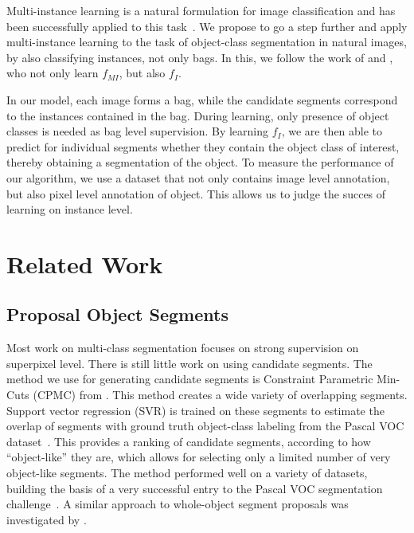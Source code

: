 Multi-instance learning is a natural formulation for image classification and
has been successfully applied to this task~\citep{zhou2007multi}. We propose to
go a step further and apply multi-instance learning to the task of object-class
segmentation in natural images, by also classifying instances, not only bags.
In this, we follow the work of \citet{liconvex2010} and \citet{zha2008joint}, who not
only learn $f_{MI}$, but also $f_{I}$.

In our model, each image forms a bag, while the candidate segments correspond
to the instances contained in the bag. During learning, only presence of object
classes is needed as bag level supervision. By learning $f_{I}$, we are then
able to predict for individual segments whether they contain the object class
of interest, thereby obtaining a segmentation of the object.
To measure the performance of our algorithm, we use a dataset that not only contains
image level annotation, but also pixel level annotation of object. This allows
us to judge the succes of learning on instance level.

\section{Related Work}
\subsection{Proposal Object Segments}\label{related_segments}
Most work on multi-class segmentation focuses on strong supervision on
superpixel level. There is still little work on using candidate segments.  The
method we use for generating candidate segments is Constraint Parametric
Min-Cuts (CPMC) from \citet{carreira2010constrained}.  This method creates a
wide variety of overlapping segments. Support vector regression (SVR) is
trained on these segments to estimate the overlap of segments with ground truth
object-class labeling from the Pascal VOC dataset~\citep{pascal}. This provides
a ranking of candidate segments, according to how ``object-like'' they are,
which allows for selecting only a limited number of very object-like segments.
The method performed well on a variety of datasets, building the basis of
a very successful entry to the Pascal VOC segmentation
challenge~\citep{li2010object}. A similar approach to whole-object segment
proposals was investigated by \citet{endres2010category}.

